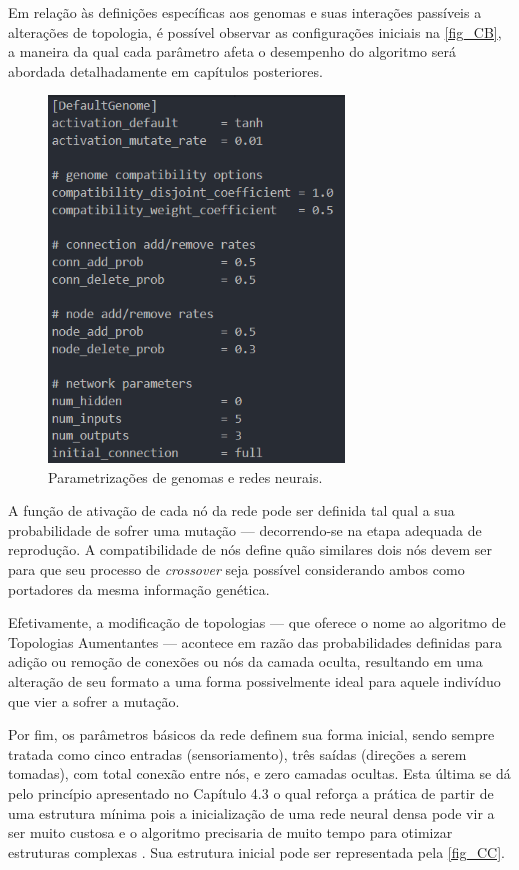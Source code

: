 Em relação às definições específicas aos genomas e suas interações passíveis a alterações de topologia,
é possível observar as configurações iniciais na \autoref{fig_CB}, a maneira da qual cada parâmetro afeta
o desempenho do algoritmo será abordada detalhadamente em capítulos posteriores.

\begin{figure}[htb]
        \centering
        \caption{\label{fig_CB}Parametrizações de genomas e redes neurais.}
        \includegraphics[width=0.7\textwidth]{images/CB.png}
\end{figure}

A função de ativação de cada nó da rede pode ser definida tal qual a sua probabilidade de sofrer uma mutação
— decorrendo-se na etapa adequada de reprodução. A compatibilidade de nós define quão similares dois nós
devem ser para que seu processo de \textit{crossover} seja possível considerando ambos como portadores da mesma informação genética.

Efetivamente, a modificação de topologias — que oferece o nome ao algoritmo de Topologias Aumentantes — acontece
em razão das probabilidades definidas para adição ou remoção de conexões ou nós da camada oculta,
resultando em uma alteração de seu formato a uma forma possivelmente ideal para aquele indivíduo que vier a sofrer a mutação.

Por fim, os parâmetros básicos da rede definem sua forma inicial, sendo sempre tratada como cinco entradas
(sensoriamento), três saídas (direções a serem tomadas), com total conexão entre nós, e zero camadas ocultas.
Esta última se dá pelo princípio apresentado no Capítulo 4.3 o qual reforça a prática de partir de uma
estrutura mínima pois a inicialização de uma rede neural densa pode vir a ser muito custosa e o algoritmo
precisaria de muito tempo para otimizar estruturas complexas \cite{stanley2004neat}. Sua estrutura inicial
pode ser representada pela \autoref{fig_CC}.

